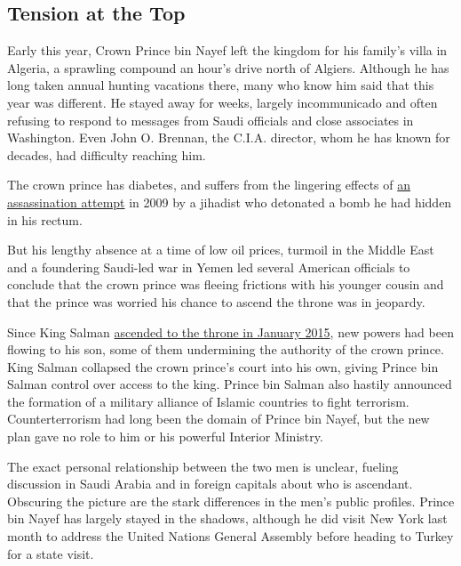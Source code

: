 \hypertarget{tension-at-the-top}{%
\subsection{Tension at the Top}\label{tension-at-the-top}}

Early this year, Crown Prince bin Nayef left the kingdom for his
family's villa in Algeria, a sprawling compound an hour's drive north of
Algiers. Although he has long taken annual hunting vacations there, many
who know him said that this year was different. He stayed away for
weeks, largely incommunicado and often refusing to respond to messages
from Saudi officials and close associates in Washington. Even John O.
Brennan, the C.I.A. director, whom he has known for decades, had
difficulty reaching him.

The crown prince has diabetes, and suffers from the lingering effects of
\href{http://www.nytimes3xbfgragh.onion/2009/08/29/world/middleeast/29saudi.html}{an
assassination attempt} in 2009 by a jihadist who detonated a bomb he had
hidden in his rectum.

But his lengthy absence at a time of low oil prices, turmoil in the
Middle East and a foundering Saudi-led war in Yemen led several American
officials to conclude that the crown prince was fleeing frictions with
his younger cousin and that the prince was worried his chance to ascend
the throne was in jeopardy.

Since King Salman
\href{http://www.nytimes3xbfgragh.onion/2015/01/23/world/middleeast/salman-ascends-throne-to-become-saudi-king.html}{ascended
to the throne in January 2015}, new powers had been flowing to his son,
some of them undermining the authority of the crown prince. King Salman
collapsed the crown prince's court into his own, giving Prince bin
Salman control over access to the king. Prince bin Salman also hastily
announced the formation of a military alliance of Islamic countries to
fight terrorism. Counterterrorism had long been the domain of Prince bin
Nayef, but the new plan gave no role to him or his powerful Interior
Ministry.

The exact personal relationship between the two men is unclear, fueling
discussion in Saudi Arabia and in foreign capitals about who is
ascendant. Obscuring the picture are the stark differences in the men's
public profiles. Prince bin Nayef has largely stayed in the shadows,
although he did visit New York last month to address the United Nations
General Assembly before heading to Turkey for a state visit.

